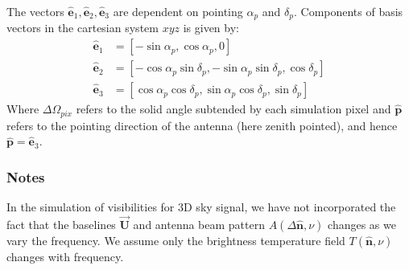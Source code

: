 \documentclass[a4paper,11pt,oneside,english,openany]{sphinxmanual}
\begin{document}
\sphinxAtStartPar
The  vectors \(\hat{\mathbf{e}}_1,\hat{\mathbf{e}}_2,\hat{\mathbf{e}}_3\) are dependent on pointing  \(\alpha_p\) and  \(\delta_p\). Components of basis vectors in the cartesian system \(xyz\) is given by:
\begin{equation*}
\begin{split}\hat{\mathbf{e}}_1&=[-\sin{\alpha_p},\cos{\alpha_p},0]\\
\hat{\mathbf{e}}_2&=[-\cos{\alpha_p}\sin{\delta_p},-\sin{\alpha_p}\sin{\delta_p},\cos{\delta_p}]\\
\hat{\mathbf{e}}_3&=[\cos{\alpha_p}\cos{\delta_p},\sin{\alpha_p}\cos{\delta_p},\sin{\delta_p}]\end{split}
\end{equation*}
\sphinxAtStartPar
Where \(\Delta\Omega_{pix}\) refers to the solid angle subtended by each simulation pixel and \(\hat{\mathbf{p}}\) refers to the pointing direction of the antenna (here zenith pointed), and hence \(\hat{\mathbf{p}}=\hat{\mathbf{e}}_3\).
\subsubsection*{Notes}

\sphinxAtStartPar
In the simulation of visibilities for 3D sky signal, we have not incorporated the fact that the baselines \(\vec{\textbf{U}}\) and antenna beam pattern \({A}(\Delta\hat{\mathbf{n}},\nu)\) changes as we vary the frequency. We assume only the brightness temperature field \(T(\hat{\mathbf{n}},\nu)\) changes with frequency.
\end{document}
